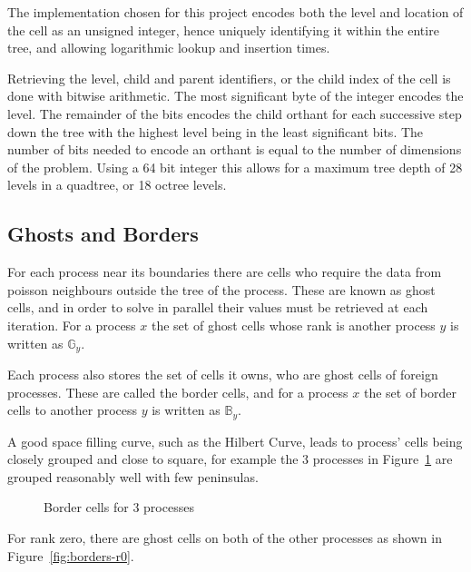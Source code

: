 \documentclass[twoside]{IIBproject}
\numberwithin{figure}{section}
\begin{document}
        The implementation chosen for this project encodes both the level and location of the cell as an unsigned integer, hence uniquely identifying it within the entire tree, and allowing logarithmic lookup and insertion times.

        Retrieving the level, child and parent identifiers, or the child index of the cell is done with bitwise arithmetic. The most significant byte of the integer encodes the level. The remainder of the bits encodes the child orthant for each successive step down the tree with the highest level being in the least significant bits. The number of bits needed to encode an orthant is equal to the number of dimensions of the problem. Using a 64 bit integer this allows for a maximum tree depth of 28 levels in a quadtree, or 18 octree levels.



    \subsection{Ghosts and Borders} %
        \label{sec:ghostsandborders}

        For each process near its boundaries there are cells who require the data from poisson neighbours outside the tree of the process. These are known as ghost cells, and in order to solve in parallel their values must be retrieved at each iteration. For a process $x$ the set of ghost cells whose rank is another process $y$ is written as $\mathbb{G}_y$.

        Each process also stores the set of cells it owns, who are ghost cells of foreign processes. These are called the border cells, and for a process $x$ the set of border cells to another process $y$ is written as $\mathbb{B}_y$.

        A good space filling curve, such as the Hilbert Curve, leads to process' cells being closely grouped and close to square, for example the 3 processes in Figure~\ref{fig:borderline} are grouped reasonably well with few peninsulas.

        \begin{figure}[H]
            
            \caption{Border cells for 3 processes}
            \label{fig:borderline}
        \end{figure}

        For rank zero, there are ghost cells on both of the other processes as shown in Figure~\ref{fig:borders-r0}.
\end{document}
